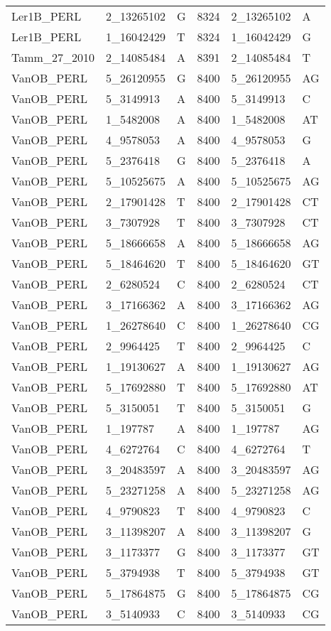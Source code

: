 \begin{center}
\begin{longtable}{|l|l|l|l|l|l|}
Ler1B\_PERL&2\_13265102&G&8324&2\_13265102&A\\
Ler1B\_PERL&1\_16042429&T&8324&1\_16042429&G\\
Tamm\_27\_2010&2\_14085484&A&8391&2\_14085484&T\\
VanOB\_PERL&5\_26120955&G&8400&5\_26120955&AG\\
VanOB\_PERL&5\_3149913&A&8400&5\_3149913&C\\
VanOB\_PERL&1\_5482008&A&8400&1\_5482008&AT\\
VanOB\_PERL&4\_9578053&A&8400&4\_9578053&G\\
VanOB\_PERL&5\_2376418&G&8400&5\_2376418&A\\
VanOB\_PERL&5\_10525675&A&8400&5\_10525675&AG\\
VanOB\_PERL&2\_17901428&T&8400&2\_17901428&CT\\
VanOB\_PERL&3\_7307928&T&8400&3\_7307928&CT\\
VanOB\_PERL&5\_18666658&A&8400&5\_18666658&AG\\
VanOB\_PERL&5\_18464620&T&8400&5\_18464620&GT\\
VanOB\_PERL&2\_6280524&C&8400&2\_6280524&CT\\
VanOB\_PERL&3\_17166362&A&8400&3\_17166362&AG\\
VanOB\_PERL&1\_26278640&C&8400&1\_26278640&CG\\
VanOB\_PERL&2\_9964425&T&8400&2\_9964425&C\\
VanOB\_PERL&1\_19130627&A&8400&1\_19130627&AG\\
VanOB\_PERL&5\_17692880&T&8400&5\_17692880&AT\\
VanOB\_PERL&5\_3150051&T&8400&5\_3150051&G\\
VanOB\_PERL&1\_197787&A&8400&1\_197787&AG\\
VanOB\_PERL&4\_6272764&C&8400&4\_6272764&T\\
VanOB\_PERL&3\_20483597&A&8400&3\_20483597&AG\\
VanOB\_PERL&5\_23271258&A&8400&5\_23271258&AG\\
VanOB\_PERL&4\_9790823&T&8400&4\_9790823&C\\
VanOB\_PERL&3\_11398207&A&8400&3\_11398207&G\\
VanOB\_PERL&3\_1173377&G&8400&3\_1173377&GT\\
VanOB\_PERL&5\_3794938&T&8400&5\_3794938&GT\\
VanOB\_PERL&5\_17864875&G&8400&5\_17864875&CG\\
VanOB\_PERL&3\_5140933&C&8400&3\_5140933&CG\\

\end{longtable}
\end{center}
